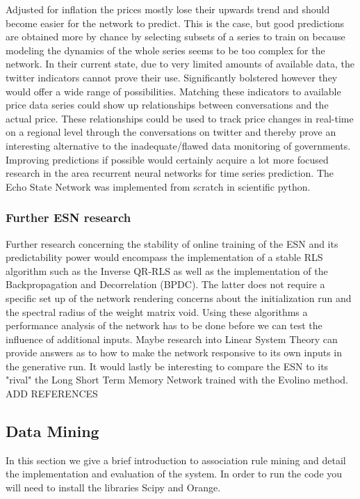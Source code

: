 Adjusted for inflation the prices mostly lose their upwards trend and should become easier for the network to predict. This is the case, but good predictions are obtained more by chance by selecting subsets of a series to train on because modeling the dynamics of the whole series seems to be too complex for the network. In their current state, due to very limited amounts of available data, the twitter indicators cannot prove their use. Significantly bolstered however they would offer a wide range of possibilities. Matching these indicators to available price data series could show up relationships between conversations and the actual price. These relationships could be used to track price changes in real-time on a regional level through the conversations on twitter and thereby prove an interesting alternative to the inadequate/flawed data monitoring of governments. Improving predictions if possible would certainly acquire a lot more focused research in the area recurrent neural networks for time series prediction. The Echo State Network was implemented from scratch in scientific python.

\subsubsection*{Further ESN research}
Further research concerning the stability of online training of the ESN and its predictability power would encompass the implementation of a stable RLS algorithm such as the Inverse QR-RLS as well as the implementation of the Backpropagation and Decorrelation (BPDC). The latter does not require a specific set up of the network rendering concerns about the initialization run and the spectral radius of the weight matrix void. Using these algorithms a performance analysis of the network has to be done before we can test the influence of additional inputs. Maybe research into Linear System Theory can provide answers as to how to make the network responsive to its own inputs in the generative run. It would lastly be interesting  to compare the ESN to its "rival" the Long Short Term Memory Network trained with the Evolino method.
ADD REFERENCES

\subsection*{Data Mining}

In this section we give a brief introduction to association rule mining and detail the implementation and evaluation of the system. In order to run the code you will need to install the libraries Scipy and Orange.

